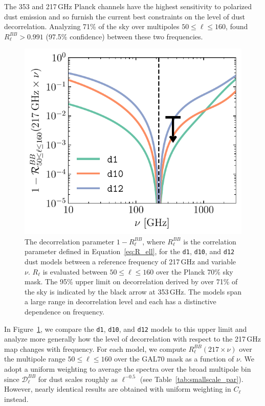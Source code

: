 \documentclass[twocolumn]{aastex631}
\begin{document}
The 353 and 217\,GHz Planck channels have the highest sensitivity to polarized dust emission and so furnish the current best constraints on the level of dust decorrelation. Analyzing 71\% of the sky over multipoles $50 \leq \ell \leq 160$, \citet{planck2016-l11A} found $R_\ell^{BB} > 0.991$ (97.5\% confidence) between these two frequencies.

\begin{figure}
    \centering
    \includegraphics[width=\columnwidth]{figures/decorrelation_dust.pdf}
    \caption{The decorrelation parameter $1-R_\ell^{BB}$, where $R_\ell^{BB}$ is the correlation parameter defined in Equation~\eqref{eq:R_ell}, for the \texttt{d1}, \texttt{d10}, and \texttt{d12} dust models between a reference frequency of 217\,GHz and variable $\nu$. $R_\ell$ is evaluated between $50 \leq \ell \leq 160$ over the Planck 70\% sky mask. The 95\% upper limit on decorrelation derived by \citet{planck2016-l11A} over 71\% of the sky is indicated by the black arrow at 353\,GHz. The models span a large range in decorrelation level and each has a distinctive dependence on frequency.}
    \label{fig:decorrelation}
\end{figure}

In Figure~\ref{fig:decorrelation}, we compare the \texttt{d1}, \texttt{d10}, and \texttt{d12} models to this upper limit and analyze more generally how the level of decorrelation with respect to the 217\,GHz map changes with frequency. For each model, we compute $R_\ell^{BB}\left(217\times\nu\right)$ over the multipole range $50 \leq \ell \leq 160$ over the GAL70 mask as a function of $\nu$. We adopt a uniform weighting to average the spectra over the broad multipole bin since $\mathcal{D}_\ell^{BB}$ for dust scales roughly as $\ell^{-0.5}$ (see Table~\ref{tab:smallscale_par}). However, nearly identical results are obtained with uniform weighting in $C_\ell$ instead.
\end{document}
